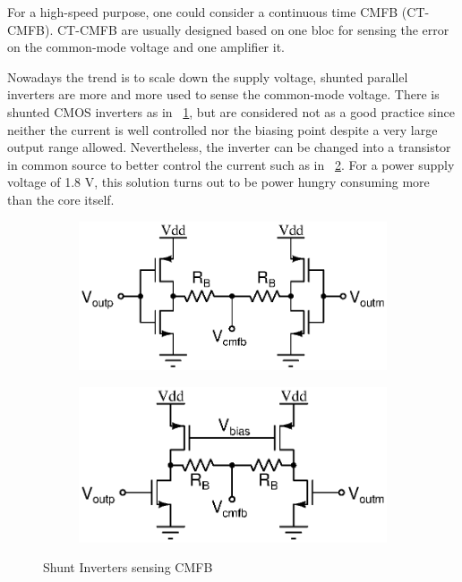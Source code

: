 For a high-speed purpose, one could consider a continuous time CMFB (CT-CMFB). CT-CMFB are usually designed based on one bloc for sensing the error on the common-mode voltage and one amplifier it.

Nowadays the trend is to scale down the supply voltage, shunted parallel inverters are more and more used to sense the common-mode voltage. There is shunted CMOS inverters as in \figurename~\ref{fig:shunt_cmos_cmfb}, but are considered not as a good practice since neither the current is well controlled nor the biasing point despite a very large output range allowed. Nevertheless, the inverter can be changed into a transistor in common source to better control the current such as in \figurename~\ref{fig:shunt_inverter_cmfb}\cite{Carillo2007,Carillo2010,Centurelli2017}. For a power supply voltage of 1.8 V, this solution turns out to be power hungry consuming more than the core itself.

\begin{figure}[htp]
    \centering
    \begin{subfigure}[b]{0.48\textwidth}
        \includegraphics[width=\textwidth]{Chapter7/Figs/shunt_cmos_cmfb.ps}
        \label{fig:shunt_cmos_cmfb}
    \end{subfigure}
    \begin{subfigure}[b]{0.48\textwidth}
        \includegraphics[width=\textwidth]{Chapter7/Figs/shunt_inverter_cmfb.ps}
        \label{fig:shunt_inverter_cmfb}
    \end{subfigure}
    \caption{Shunt Inverters sensing CMFB}
    \label{fig:shunt_inverter_sensing}
\end{figure}

